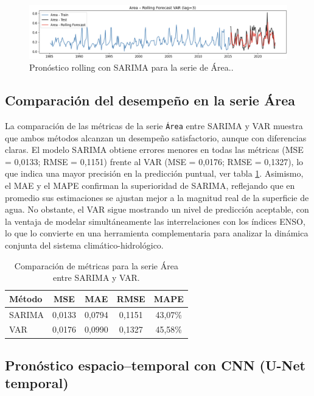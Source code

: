\begin{figure}[H]
    \centering
    \includegraphics[scale=0.30]{Figures/rolling_var.png}
    \caption{Pronóstico rolling con SARIMA para la serie de Área..}
    \label{fig:rolling_var}
\end{figure}

\subsection{Comparación del desempeño en la serie Área}
La comparación de las métricas de la serie \texttt{Área} entre SARIMA y VAR muestra que ambos métodos alcanzan un desempeño satisfactorio, aunque con diferencias claras. El modelo SARIMA obtiene errores menores en todas las métricas (MSE = 0,0133; RMSE = 0,1151) frente al VAR (MSE = 0,0176; RMSE = 0,1327), lo que indica una mayor precisión en la predicción puntual, ver tabla \ref{tab:comp_area}. Asimismo, el MAE y el MAPE confirman la superioridad de SARIMA, reflejando que en promedio sus estimaciones se ajustan mejor a la magnitud real de la superficie de agua. No obstante, el VAR sigue mostrando un nivel de predicción aceptable, con la ventaja de modelar simultáneamente las interrelaciones con los índices ENSO, lo que lo convierte en una herramienta complementaria para analizar la dinámica conjunta del sistema climático-hidrológico.
\begin{table}[H]
    \centering
    \caption{Comparación de métricas para la serie Área entre SARIMA y VAR.}
    \label{tab:comp_area}
    \begin{tabular}{lcccc}
        \toprule
        Método & MSE & MAE & RMSE & MAPE \\
        \midrule
        SARIMA & 0,0133 & 0,0794 & 0,1151 & 43,07\% \\
        VAR    & 0,0176 & 0,0990 & 0,1327 & 45,58\% \\
        \bottomrule
    \end{tabular}
\end{table}


\subsection{Pronóstico espacio–temporal con CNN (U-Net temporal)}

